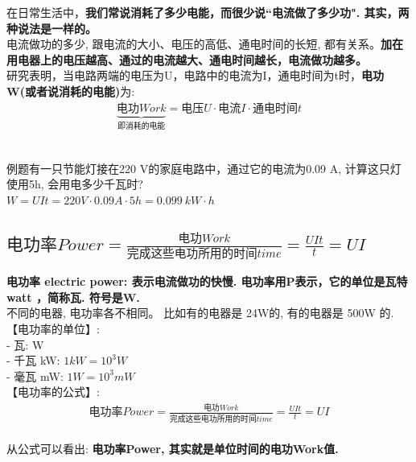 \documentclass[UTF8]{ctexart}
\begin{document}
在日常生活中，\textbf{我们常说消耗了多少电能，而很少说``电流做了多少功". 其实，两种说法是一样的。} \\

电流做功的多少, 跟电流的大小、电压的高低、通电时间的长短, 都有关系。\textbf{加在用电器上的电压越高、通过的电流越大、通电时间越长，电流做功越多。} \\
研究表明，当电路两端的电压为U，电路中的电流为I，通电时间为t时，\textbf{电功W(或者说消耗的电能)}为: 
\begin{align*}
	\boxed{
		\underset{\text{即消耗的电能}}{\underbrace{\text{电功}Work}}=\text{电压}U\cdot \text{电流}I\cdot \text{通电时间}t		
	}
\end{align*} \\




\begin{tcolorbox}[title = {例},boxrule={0.1em},colframe={black!10}, colback={black!3},colbacktitle={black!10},coltitle={black}]
例题有一只节能灯接在220 V的家庭电路中，通过它的电流为0.09 A, 计算这只灯使用5h, 会用电多少千瓦时?  \\
$W=UIt=220V \cdot 0.09A \cdot 5h = 0.099 \ kW·h$
\end{tcolorbox}


\vspace{1em} 

\subsection{$\text{电功率}Power=\frac{\text{电功}Work}{\text{完成这些电功所用的时间}time}=\frac{UIt}{t}=UI$}

\textbf{电功率 electric power: 表示电流做功的快慢. 电功率用P表示，它的单位是瓦特 watt ，简称瓦. 符号是W.} \\
不同的电器, 电功率各不相同。 比如有的电器是 24W的, 有的电器是 500W 的. \\

【电功率的单位】: \\
- 瓦: W \\
- 千瓦 kW: $1kW = 10^3 W$ \\
- 毫瓦 mW: $1W = 10^3 mW$ \\


【电功率的公式】: 
\begin{align*}
	\boxed{
	\text{电功率}Power=\frac{\text{电功}Work}{\text{完成这些电功所用的时间}time}=\frac{UIt}{t}=UI		
	}
\end{align*} \\
从公式可以看出: \textbf{电功率Power, 其实就是单位时间的电功Work值.} \\
\end{document}
